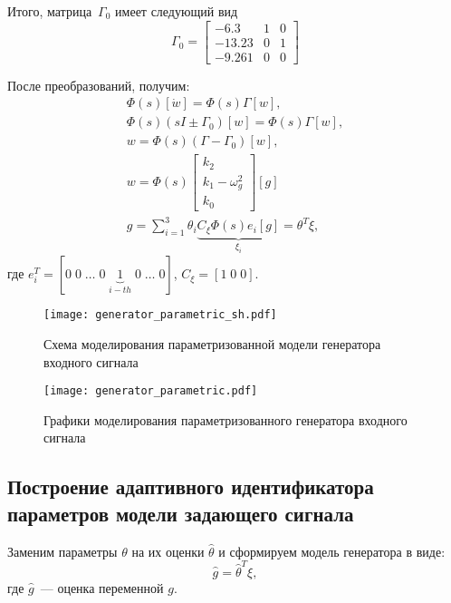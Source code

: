 Итого, матрица~$\Gamma_0$ имеет следующий вид
\begin{equation}
	\Gamma_0 =
	\begin{bmatrix}
		-6.3 & 1 & 0 \\
		-13.23 & 0 & 1 \\
		-9.261 & 0 & 0
	\end{bmatrix}
\end{equation}

После преобразований, получим:
\begin{gather}
	\Phi(s) [\dot{w}] = \Phi(s) \Gamma [w], \\
	\Phi(s) (sI \pm \Gamma_0) [w] = \Phi(s) \Gamma [w], \\ 
	w = \Phi(s) (\Gamma - \Gamma_0) [w], \\
	w = \Phi(s) 
	\begin{bmatrix}
	k_2 \\ k_1 - \omega_g^2 \\ k_0        
	\end{bmatrix}
	[g] \\
	g = \sum_{i=1}^{3} \theta_{i} \underbrace{C_{\xi} \Phi(s) e_{i} [g]}_{\xi_i} =  \theta^T \xi,
\end{gather}
где $e_i^T = [0\;0\;\ldots\;0\;\underbrace{1}_{i-th}\;0\;\ldots\;0]$, $C_{\xi} = [1\;0\;0]$.


\begin{figure}[h!]
	\centering
	\texttt{[image: generator\_parametric\_sh.pdf]}
	\caption{Схема моделирования параметризованной модели генератора входного сигнала}
	\label{fg:generator_parametric_sh}
\end{figure}

\begin{figure}[h!]
	\centering
	\texttt{[image: generator\_parametric.pdf]}
	\caption{Графики моделирования параметризованного генератора входного сигнала}
	\label{fg:generator_parametric}
\end{figure}

\clearpage
\subsection{Построение адаптивного идентификатора параметров модели задающего сигнала}

Заменим параметры $\theta$ на их оценки $\hat{\theta}$ и сформируем модель генератора в виде:
\begin{equation}
	\hat{g} = \hat{\theta}^T \xi,
\end{equation}
где $\hat{g}$~--- оценка переменной $g$.

